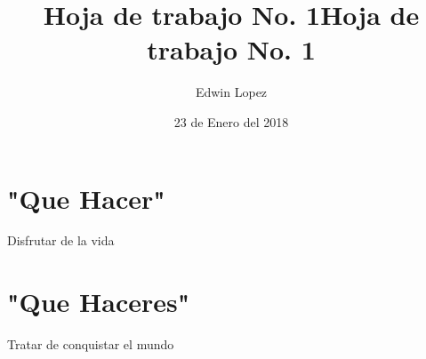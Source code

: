 \documentclass{article}
\author{Edwin Lopez}
\title{Hoja de trabajo No. 1}
\date {23 de Enero del 2018}
\begin{document}
\maketitle
\title{Hoja de trabajo No. 1}
\section{"Que Hacer"}
Disfrutar de la vida
\section{"Que Haceres"}
Tratar de conquistar el mundo
\end{document}
